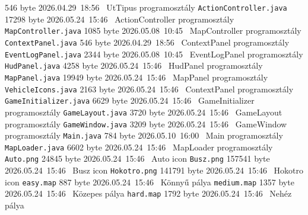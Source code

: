 \begin{fajllista}
    {546 byte} %
    {2026.04.29~18:56~} %
    {UtTipus programosztály} %
    \fajl
    {\texttt{ActionController.java}} %
    {17298 byte} %
    {2026.05.24~15:46~} %
    {ActionController programosztály} %
    \fajl
    {\texttt{MapController.java}} %
    {1085 byte} %
    {2026.05.08~10:45~} %
    {MapController programosztály} %
    \fajl
    {\texttt{ContextPanel.java}} %
    {546 byte} %
    {2026.04.29~18:56~} %
    {ContextPanel programosztály} %
    \fajl
    {\texttt{EventLogPanel.java}} %
    {2344 byte} %
    {2026.05.08~10:45~} %
    {EventLogPanel programosztály} %
    \fajl
    {\texttt{HudPanel.java}} %
    {4258 byte} %
    {2026.05.24~15:46~} %
    {HudPanel programosztály} %
    \fajl
    {\texttt{MapPanel.java}} %
    {19949 byte} %
    {2026.05.24~15:46~} %
    {MapPanel programosztály} %
    \fajl
    {\texttt{VehicleIcons.java}} %
    {2163 byte} %
    {2026.05.24~15:46~} %
    {ContextPanel programosztály} %
    \fajl
    {\texttt{GameInitializer.java}} %
    {6629 byte} %
    {2026.05.24~15:46~} %
    {GameInitializer programosztály} %
    \fajl
    {\texttt{GameLayout.java}} %
    {3720 byte} %
    {2026.05.24~15:46~} %
    {GameLayout programosztály} %
    \fajl
    {\texttt{GameWindow.java}} %
    {3209 byte} %
    {2026.05.24~15:46~} %
    {GameWindow programosztály} %
    \fajl
    {\texttt{Main.java}} %
    {784 byte} %
    {2026.05.10~16:00~} %
    {Main programosztály} %
    \fajl
    {\texttt{MapLoader.java}} %
    {6602 byte} %
    {2026.05.24~15:46~} %
    {MapLoader programosztály} %
    \fajl
    {\texttt{Auto.png}} %
    {24845 byte} %
    {2026.05.24~15:46~} %
    {Auto icon} %
    \fajl
    {\texttt{Busz.png}} %
    {157541 byte} %
    {2026.05.24~15:46~} %
    {Busz icon} %
    \fajl
    {\texttt{Hokotro.png}} %
    {141791 byte} %
    {2026.05.24~15:46~} %
    {Hokotro icon} %
    \fajl
    {\texttt{easy.map}} %
    {887 byte} %
    {2026.05.24~15:46~} %
    {Könnyű pálya} %
    \fajl
    {\texttt{medium.map}} %
    {1357 byte} %
    {2026.05.24~15:46~} %
    {Közepes pálya} %
    \fajl
    {\texttt{hard.map}} %
    {1792 byte} %
    {2026.05.24~15:46~} %
    {Nehéz pálya} %
\end{fajllista}

